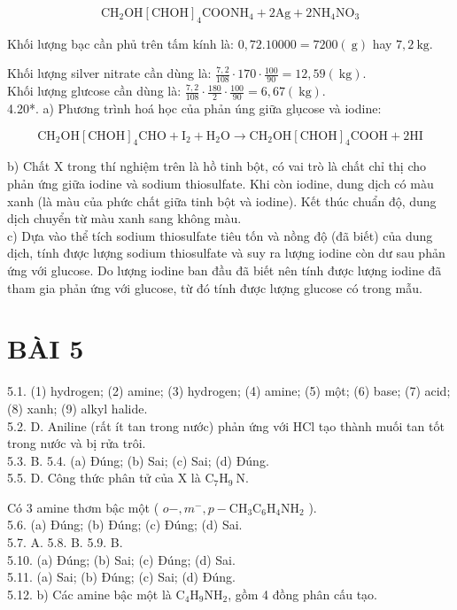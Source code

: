 \documentclass[10pt]{article}
\begin{document}
$$
\mathrm{CH}_{2} \mathrm{OH}[\mathrm{CHOH}]_{4} \mathrm{COONH}_{4}+2 \mathrm{Ag}+2 \mathrm{NH}_{4} \mathrm{NO}_{3}
$$

Khối lượng bạc cần phủ trên tấm kính là: $0,72.10000=7200(\mathrm{~g})$ hay $7,2 \mathrm{~kg}$.

Khối lượng silver nitrate cần dùng là: $\frac{7,2}{108} \cdot 170 \cdot \frac{100}{90}=12,59(\mathrm{~kg})$.\\
Khối lượng glưcose cần dùng là: $\frac{7,2}{108} \cdot \frac{180}{2} \cdot \frac{100}{90}=6,67(\mathrm{~kg})$.\\
4.20*. a) Phương trình hoá học của phản úng giữa glụcose và iodine:

$$
\mathrm{CH}_{2} \mathrm{OH}[\mathrm{CHOH}]_{4} \mathrm{CHO}+\mathrm{I}_{2}+\mathrm{H}_{2} \mathrm{O} \longrightarrow \mathrm{CH}_{2} \mathrm{OH}[\mathrm{CHOH}]_{4} \mathrm{COOH}+2 \mathrm{HI}
$$

b) Chất X trong thí nghiệm trên là hồ tinh bột, có vai trò là chất chỉ thị cho phản ứng giữa iodine và sodium thiosulfate. Khi còn iodine, dung dịch có màu xanh (là màu của phức chất giữa tinh bột và iodine). Kết thúc chuẩn độ, dung dịch chuyển từ màu xanh sang không màu.\\
c) Dựa vào thể tích sodium thiosulfate tiêu tốn và nồng độ (đã biết) của dung dịch, tính được lượng sodium thiosulfate và suy ra lượng iodine còn dư sau phản ứng với glucose. Do lượng iodine ban đầu đã biết nên tính được lượng iodine đã tham gia phản ứng với glucose, từ đó tính được lượng glucose có trong mẫu.

\section*{BÀI 5}
5.1. (1) hydrogen; (2) amine; (3) hydrogen; (4) amine; (5) một; (6) base; (7) acid; (8) xanh; (9) alkyl halide.\\
5.2. D. Aniline (rất ít tan trong nước) phản ứng với HCl tạo thành muối tan tốt trong nước và bị rửa trôi.\\
5.3. B. 5.4. (a) Đúng; (b) Sai; (c) Sai; (d) Đúng.\\
5.5. D. Công thức phân tử của X là $\mathrm{C}_{7} \mathrm{H}_{9} \mathrm{~N}$.

Có 3 amine thơm bậc một ( $o-, m^{-}, p-\mathrm{CH}_{3} \mathrm{C}_{6} \mathrm{H}_{4} \mathrm{NH}_{2}$ ).\\
5.6. (a) Đúng; (b) Đúng; (c) Đúng; (d) Sai.\\
5.7. A. 5.8. B. 5.9. B.\\
5.10. (a) Đúng; (b) Sai; (c) Đúng; (d) Sai.\\
5.11. (a) Sai; (b) Đúng; (c) Sai; (d) Đúng.\\
5.12. b) Các amine bậc một là $\mathrm{C}_{4} \mathrm{H}_{9} \mathrm{NH}_{2}$, gồm 4 đồng phân cấu tạo.
\end{document}
